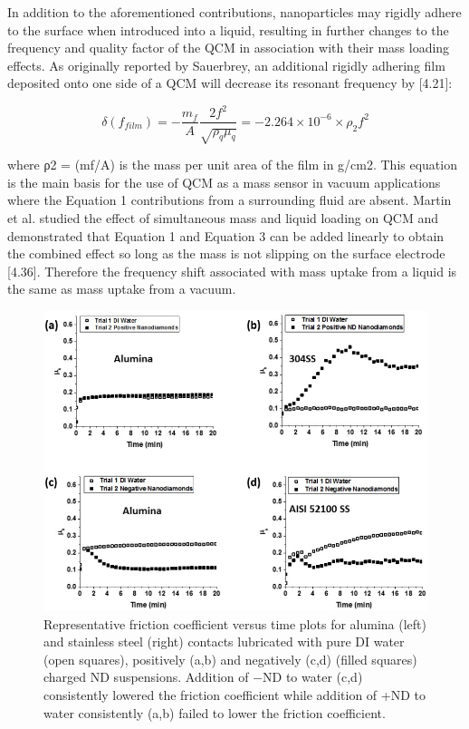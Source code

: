 In addition to the aforementioned contributions, nanoparticles may rigidly adhere to the surface when introduced into a liquid, resulting in further changes to the frequency and quality factor of the QCM in association with their mass loading effects. As originally reported by Sauerbrey, an additional rigidly adhering film deposited onto one side of a QCM will decrease its resonant frequency by [4.21]:

\begin{equation}
\delta (f_{film})=-\frac{m_{f}}{A}  \frac{2f^{2}}{\sqrt{\rho_{q}\mu _{q}}} = - 2.264 \times  {10^{-6}}\times  \rho_{2}f^{2}
\label{ch5:eq3}
\end{equation} 

where ρ2 = (mf/A) is the mass per unit area of the film in g/cm2. This equation is the main basis for the use of QCM as a mass sensor in vacuum applications where the Equation 1 contributions from a surrounding fluid are absent. Martin et al. studied the effect of simultaneous mass and liquid loading on QCM and demonstrated that Equation 1 and Equation 3 can be added linearly to obtain the combined effect so long as the mass is not slipping on the surface electrode [4.36]. Therefore the frequency shift associated with mass uptake from a liquid is the same as mass uptake from a vacuum.

\begin{figure}[hbtp]
	\centering
	\includegraphics[width=1.0\textwidth]{Chapter-4/fig3_png}
	\caption{Representative friction coefficient versus time plots for alumina (left) and stainless steel (right) contacts lubricated with pure DI water (open squares), positively (a,b) and negatively (c,d) (filled squares) charged ND suspensions. Addition of −ND to water (c,d) consistently lowered the friction coefficient while addition of +ND to water consistently (a,b) failed to lower the friction coefficient.}
	\label{fig3:MTM plots}
\end{figure} 

